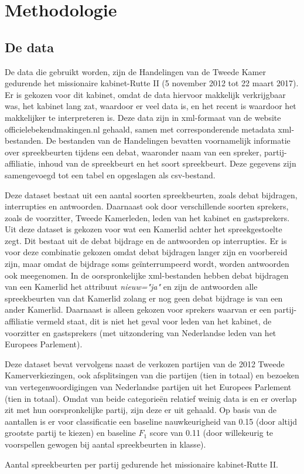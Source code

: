 \section{Methodologie}
\label{sec:meth}


\subsection{De data}
De data die gebruikt worden, zijn de Handelingen van de Tweede Kamer gedurende het missionaire kabinet-Rutte II (5 november 2012 tot 22 maart 2017). Er is gekozen voor dit kabinet, omdat de data hiervoor makkelijk verkrijgbaar was, het kabinet lang zat, waardoor er veel data is, en het recent is waardoor het makkelijker te interpreteren is. Deze data zijn in xml-formaat van de website officielebekendmakingen.nl gehaald, samen met corresponderende metadata xml-bestanden. De bestanden van de Handelingen bevatten voornamelijk informatie over spreekbeurten tijdens een debat, waaronder naam van een spreker, partij-affiliatie, inhoud van de spreekbeurt en het soort spreekbeurt. Deze gegevens zijn samengevoegd tot een tabel en opgeslagen als csv-bestand.\par

Deze dataset bestaat uit een aantal soorten spreekbeurten, zoals debat bijdragen, interrupties en antwoorden. Daarnaast ook door verschillende soorten sprekers, zoals de voorzitter, Tweede Kamerleden, leden van het kabinet en gastsprekers. Uit deze dataset is gekozen voor wat een Kamerlid achter het spreekgestoelte zegt. Dit bestaat uit de debat bijdrage en de antwoorden op interrupties. Er is voor deze combinatie gekozen omdat debat bijdragen langer zijn en voorbereid zijn, maar omdat de bijdrage soms geïnterrumpeerd wordt, worden antwoorden ook meegenomen. In de oorspronkelijke xml-bestanden hebben debat bijdragen van een Kamerlid het attribuut \textit{nieuw="ja"} en zijn de antwoorden alle spreekbeurten van dat Kamerlid zolang er nog geen debat bijdrage is van een ander Kamerlid.  Daarnaast is alleen gekozen voor sprekers waarvan er een partij-affiliatie vermeld staat, dit is niet het geval voor leden van het kabinet, de voorzitter en gastsprekers  (met uitzondering van Nederlandse leden van het Europees Parlement).\par
Deze dataset bevat vervolgens naast de verkozen partijen van de 2012 Tweede Kamerverkiezingen, ook afsplitsingen van die partijen (tien in totaal) en bezoeken van vertegenwoordigingen van Nederlandse partijen uit het Europees Parlement (tien in totaal). Omdat van beide categorieën relatief weinig data is en er overlap zit met hun oorspronkelijke partij, zijn deze er uit gehaald. Op basis van de aantallen is er voor classificatie een baseline nauwkeurigheid van 0.15 (door altijd grootste partij te kiezen) en baseline $F_1$ score van 0.11 (door willekeurig te voorspellen gewogen bij aantal spreekbeurten in klasse).
\begin{table}[H]
\label{aantallen}
\caption{Aantal spreekbeurten per partij gedurende het missionaire kabinet-Rutte II.}
\centering

\end{table}




